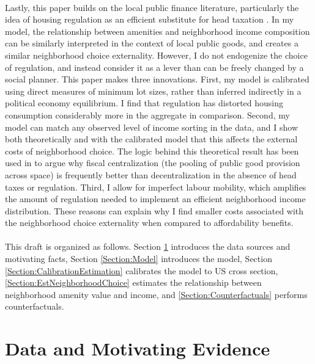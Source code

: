 \documentclass[12pt]{article}
\begin{document}
	\paragraph*{}
	Lastly, this paper builds on the local public finance literature, particularly the idea of housing regulation as an efficient substitute for head taxation \citep{hamilton1976, calabresetal, keepingpeopleout, eppleplatt, ineffTiebout, barcoate}. In my model, the relationship between amenities and neighborhood income composition can be similarly interpreted in the context of local public goods, and creates a similar neighborhood choice externality. However, I do not endogenize the choice of regulation, and instead consider it as a lever than can be freely changed by a social planner. This paper makes three innovations. First, my model is calibrated using direct measures of minimum lot sizes, rather than inferred indirectly in a political economy equilibrium. I find that regulation has distorted housing consumption considerably more in the aggregate in comparison. Second, my model can match any observed level of income sorting in the data, and I show both theoretically and with the calibrated model that this affects the external costs of neighborhood choice. The logic behind this theoretical result has been used in \cite{ineffTiebout} to argue why fiscal centralization (the pooling of public good provision across space) is frequently better than decentralization in the absence of head taxes or regulation. Third, I allow for imperfect labour mobility, which amplifies the amount of regulation needed to implement an efficient neighborhood income distribution. These reasons can explain why I find smaller costs associated with the neighborhood choice externality when compared to affordability benefits.
	
	\paragraph*{}
	This draft is organized as follows. Section \ref{Section:Evidence} introduces the data sources and motivating facts, Section \ref{Section:Model} introduces the model, Section \ref{Section:CalibrationEstimation} calibrates the model to US cross section, \ref{Section:EstNeighborhoodChoice} estimates the relationship between neighborhood amenity value and income, and \ref{Section:Counterfactuals} performs counterfactuals. 


	\section{Data and Motivating Evidence}\label{Section:Evidence}
\end{document}
